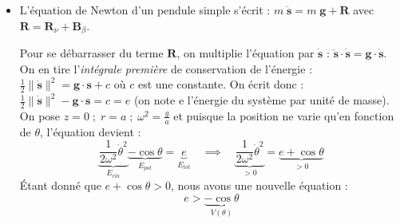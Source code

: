 \documentclass[a4paper]{article}
\begin{document}
\begin{itemize}





\item L'équation de Newton d'un pendule simple s'écrit : $\displaystyle m \; \ddot{\textbf{s}} = m \; \textbf{g} + \textbf{R} $ avec $ \textbf{R} = \textbf{R}_\nu + \textbf{B}_\beta $.

\begin{center}
\end{center}

Pour se débarrasser du terme $ \textbf{R} $, on multiplie l'équation par $ \dot{\textbf{s}} $ : $\displaystyle \ddot{\textbf{s}} \cdot \dot{\textbf{s}} = \textbf{g} \cdot \dot{\textbf{s}} $. \\
On en tire l'\emph{intégrale première} de conservation de l'énergie : $\displaystyle \frac{1}{2} \| \dot{\textbf{s}} \|^2 = \textbf{g} \cdot\textbf{s} + c $ où $ c $ est une constante. On écrit donc : $\displaystyle \frac{1}{2} \| \dot{\textbf{s}} \|^2 - \textbf{g} \cdot\textbf{s} = c = e $ (on note e l'énergie du système par unité de masse). \\
On pose $\displaystyle z = 0 \; ; \; r = a \; ; \; \omega^2 = \frac{g}{a} $ et puisque la position ne varie qu'en fonction de $ \theta $, l'équation devient : 
\[ \underbrace{\frac{1}{2 \omega^2} \dot{\theta}^2}_{E_{cin}} \underbrace{- \cos \theta}_{E_{pot}} = \underbrace{e}_{E_{tot}}  \quad \implies \quad \underbrace{\frac{1}{2 \omega^2} \dot{\theta}^2}_{> 0} = \underbrace{e + \cos \theta}_{> 0} \]
Étant donné que $\displaystyle e + \cos \theta > 0 $, nous avons une nouvelle équation : 
\[ e > \underbrace{- \cos \theta}_{V(\theta)} \]

\begin{center}
\end{center}
\end{itemize}
\end{document}

